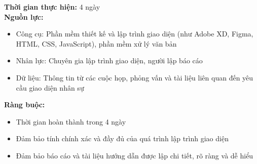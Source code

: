 {\begin{minipage}{\textwidth}
    \noindent \textbf{Thời gian thực hiện:} 4 ngày \\
    \noindent \textbf{Nguồn lực:}
    \begin{itemize}
        \item Công cụ: Phần mềm thiết kế và lập trình giao diện (như Adobe XD, Figma, HTML, CSS, JavaScript), phần mềm xử lý văn bản
        \item Nhân lực: Chuyên gia lập trình giao diện, người lập báo cáo
        \item Dữ liệu: Thông tin từ các cuộc họp, phỏng vấn và tài liệu liên quan đến yêu cầu giao diện nhân sự
    \end{itemize}
    \noindent \textbf{Ràng buộc:}
    \begin{itemize}
        \item Thời gian hoàn thành trong 4 ngày
        \item Đảm bảo tính chính xác và đầy đủ của quá trình lập trình giao diện
        \item Đảm bảo báo cáo và tài liệu hướng dẫn được lập chi tiết, rõ ràng và dễ hiểu
    \end{itemize}
    \end{minipage}
}
\newpage
{}    
